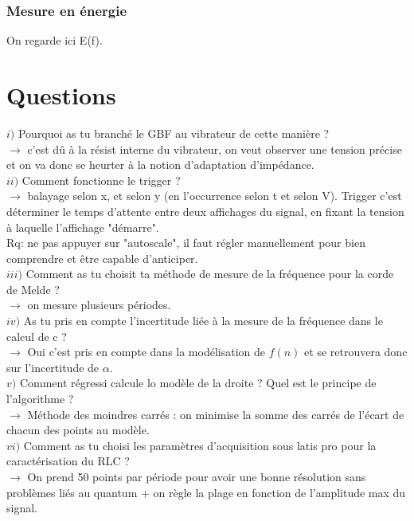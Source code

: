 \documentclass[12pt,prb,aps,epsf]{report}
\begin{document}
\subsubsection{Mesure en énergie}
On regarde ici E(f).
\section{Questions}

$i)$ Pourquoi as tu branché le GBF au vibrateur de cette manière ?\\
$\rightarrow$ c'est dû à la résist interne du vibrateur, on veut observer une tension précise et on va donc se heurter à la notion d'adaptation d'impédance.\\

$ii)$ Comment fonctionne le trigger ?\\
$\rightarrow$ balayage selon x, et selon y (en l'occurrence selon t et selon V). Trigger c'est déterminer le temps d'attente entre deux affichages du signal, en fixant la tension à laquelle l'affichage "démarre".\\
Rq: ne pas appuyer sur "autoscale", il faut régler manuellement pour bien comprendre et être capable d'anticiper.\\

$iii)$ Comment as tu choisit ta méthode de mesure de la fréquence pour la corde de Melde ?\\
$\rightarrow$ on mesure plusieurs périodes.\\

$iv)$ As tu pris en compte l'incertitude liée à la mesure de la fréquence dans le calcul de c ?\\
$\rightarrow$ Oui c'est pris en compte dans la modélisation de $f(n)$ et se retrouvera donc sur l'incertitude de $\alpha$.\\

$v)$ Comment régressi calcule lo modèle de la droite ? Quel est le principe de l'algorithme ?\\
$\rightarrow$ Méthode des moindres carrés : on minimise la somme des carrés de l'écart de chacun des points au modèle.\\

$vi)$ Comment as tu choisi les paramètres d'acquisition sous latis pro pour la caractérisation du RLC ?\\
$\rightarrow$ On prend 50 points par période pour avoir une bonne résolution sans problèmes liés au quantum + on règle la plage en fonction de l'amplitude max du signal.\\
\end{document}
